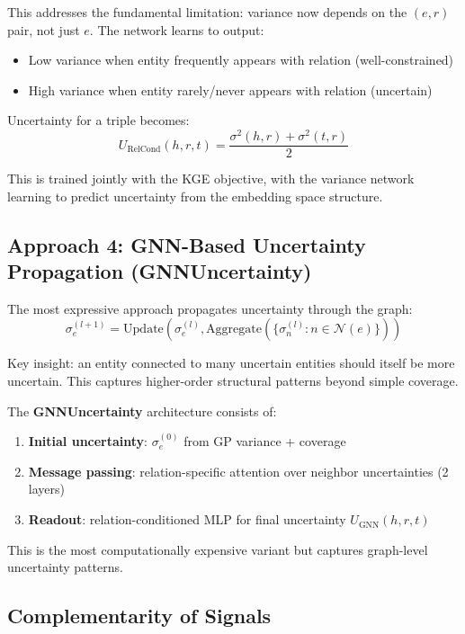 This addresses the fundamental limitation: variance now depends on the $(e, r)$ pair, not just $e$.
The network learns to output:
\begin{itemize}
    \item Low variance when entity frequently appears with relation (well-constrained)
    \item High variance when entity rarely/never appears with relation (uncertain)
\end{itemize}

Uncertainty for a triple becomes:
\begin{equation}
    U_{\text{RelCond}}(h, r, t) = \frac{\sigma^2(h, r) + \sigma^2(t, r)}{2}
\end{equation}

This is trained jointly with the KGE objective, with the variance network learning to predict uncertainty from the embedding space structure.

\subsection{Approach 4: GNN-Based Uncertainty Propagation (GNNUncertainty)}

The most expressive approach propagates uncertainty through the graph:
\begin{equation}
    \sigma^{(l+1)}_e = \text{Update}\left(\sigma^{(l)}_e, \text{Aggregate}\left(\{\sigma^{(l)}_n : n \in \mathcal{N}(e)\}\right)\right)
\end{equation}

Key insight: an entity connected to many uncertain entities should itself be more uncertain.
This captures higher-order structural patterns beyond simple coverage.

The \textbf{GNNUncertainty} architecture consists of:
\begin{enumerate}
    \item \textbf{Initial uncertainty}: $\sigma^{(0)}_e$ from GP variance + coverage
    \item \textbf{Message passing}: relation-specific attention over neighbor uncertainties (2 layers)
    \item \textbf{Readout}: relation-conditioned MLP for final uncertainty $U_{\text{GNN}}(h,r,t)$
\end{enumerate}

This is the most computationally expensive variant but captures graph-level uncertainty patterns.

\subsection{Complementarity of Signals}
\label{sec:complementarity}

